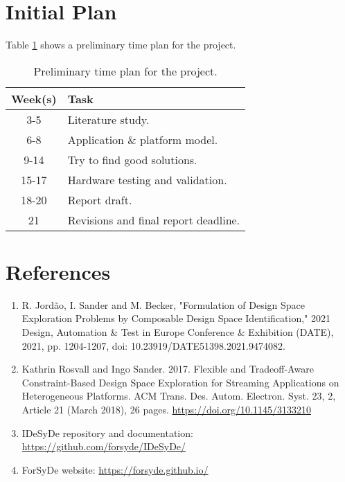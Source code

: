 \documentclass[12pt,titlepage]{article}
\begin{document}
\section{Initial Plan}
Table \ref{timeplan} shows a preliminary time plan for the project.

\begin{table}[H]
	\centering
	\begin{tabular}{c|l}
		Week(s) & Task \\
		\hline
		3-5 & Literature study. \\
		6-8 & Application \& platform model. \\
		9-14 & Try to find good solutions. \\
		15-17 & Hardware testing and validation. \\
		18-20 & Report draft. \\
		21 & Revisions and final report deadline.
	\end{tabular}
    \caption{Preliminary time plan for the project.}
	\label{timeplan}
\end{table}


\section{References}
\begin{enumerate}
\item R. Jordão, I. Sander and M. Becker, "Formulation of Design Space Exploration Problems by Composable Design Space Identification," 2021 Design, Automation \& Test in Europe Conference \& Exhibition (DATE), 2021, pp. 1204-1207, doi: 10.23919/DATE51398.2021.9474082.
\item Kathrin Rosvall and Ingo Sander. 2017. Flexible and Tradeoff-Aware Constraint-Based Design Space Exploration for Streaming Applications on Heterogeneous Platforms. ACM Trans. Des. Autom. Electron. Syst. 23, 2, Article 21 (March 2018), 26 pages. \url{https://doi.org/10.1145/3133210}
\item IDeSyDe repository and documentation: \url{https://github.com/forsyde/IDeSyDe/}
\item ForSyDe website: \url{https://forsyde.github.io/}
\end{enumerate}
\end{document}
